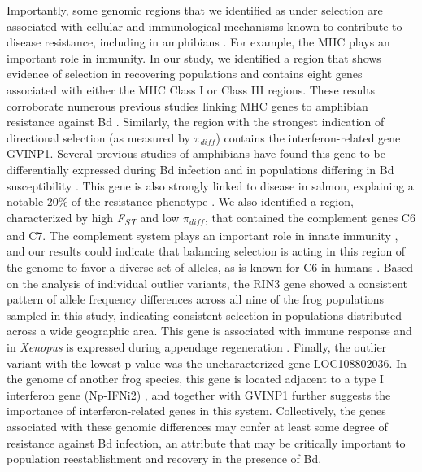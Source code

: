 \documentclass[
  letterpaper,
  DIV=11,
  numbers=noendperiod]{scrartcl}
\begin{document}
Importantly, some genomic regions that we identified as under selection
are associated with cellular and immunological mechanisms known to
contribute to disease resistance, including in amphibians
\citep{zamudio2020}. For example, the MHC plays an important role in
immunity. In our study, we identified a region that shows evidence of
selection in recovering populations and contains eight genes associated
with either the MHC Class I or Class III regions. These results
corroborate numerous previous studies linking MHC genes to amphibian
resistance against Bd \citep[e.g.,][]{savage2011, bataille2015}.
Similarly, the region with the strongest indication of directional
selection (as measured by \(\pi_{diff}\)) contains the
interferon-related gene GVINP1. Several previous studies of amphibians
have found this gene to be differentially expressed during Bd infection
\citep[e.g.,][]{grogan2018b, ellison2014} and in populations differing
in Bd susceptibility \citep{grogan2018b}. This gene is also strongly
linked to disease in salmon, explaining a notable 20\% of the resistance
phenotype \citep{robledo2020, robledo2018}. We also identified a region,
characterized by high \emph{F\textsubscript{ST}} and low \(\pi_{diff}\),
that contained the complement genes C6 and C7. The complement system
plays an important role in innate immunity \citep{rieraromo2016}, and
our results could indicate that balancing selection is acting in this
region of the genome to favor a diverse set of alleles, as is known for
C6 in humans \citep{soejima2005}. Based on the analysis of individual
outlier variants, the RIN3 gene showed a consistent pattern of allele
frequency differences across all nine of the frog populations sampled in
this study, indicating consistent selection in populations distributed
across a wide geographic area. This gene is associated with immune
response and in \emph{Xenopus} is expressed during appendage
regeneration \citep{fukazawa2009}. Finally, the outlier variant with the
lowest p-value was the uncharacterized gene LOC108802036. In the genome
of another frog species, this gene is located adjacent to a type I
interferon gene (Np-IFNi2) \citep{gan2018}, and together with GVINP1
further suggests the importance of interferon-related genes in this
system. Collectively, the genes associated with these genomic
differences may confer at least some degree of resistance against Bd
infection, an attribute that may be critically important to population
reestablishment and recovery in the presence of Bd.
\end{document}
